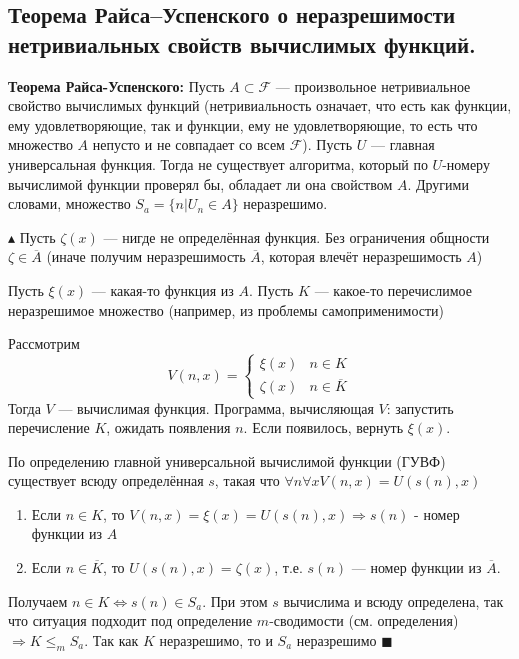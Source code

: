 \subsection{Теорема Райса–Успенского о неразрешимости нетривиальных свойств вычислимых функций.}
\par \textbf{Теорема Райса-Успенского:} Пусть $A \subset \mathcal{F}$ — произвольное нетривиальное свойство вычислимых функций (нетривиальность означает, что есть как функции, ему удовлетворяющие, так и функции, ему не удовлетворяющие, то есть что множество $A$ непусто и не совпадает со всем $\mathcal{F}$).
Пусть $U$ — главная универсальная функция. Тогда не существует алгоритма, который по $U$-номеру вычислимой функции проверял бы, обладает ли она свойством $A$. Другими словами, множество $S_a=\{n | U_n \in A\}$ неразрешимо.
\par $\blacktriangle$ Пусть $\zeta(x)$ — нигде не определённая функция. Без ограничения общности $\zeta \in  \overline{A}$ (иначе получим неразрешимость $\overline{A}$, которая влечёт неразрешимость $A$)
\par Пусть $\xi(x)$ — какая-то функция из $A$. Пусть $K$ — какое-то перечислимое неразрешимое множество (например, из проблемы самоприменимости)
\par Рассмотрим $$V(n, x) = \begin{cases}
\xi(x) & n \in K\\
\zeta(x) & n \in \overline{K}
\end{cases}$$ Тогда $V$ — вычислимая функция. Программа, вычисляющая $V$: запустить перечисление $K$, ожидать появления $n$. Если появилось, вернуть $\xi(x)$.
\par По определению главной универсальной вычислимой функции (ГУВФ) существует всюду определённая $s$, такая что $\forall n \forall x V(n,x) = U (s(n),x)$
\begin{enumerate}
    \item Если $n \in K$, то $V(n, x)=\xi(x)=U(s(n),x) \Rightarrow s(n)$ - номер функции из $A$
    \item Если $n \in \overline{K}$, то $U(s(n), x)=\zeta(x)$, т.е. $s(n)$ — номер функции из $\overline{A}$.
\end{enumerate}
\par Получаем $n \in K \Leftrightarrow s(n) \in S_a$. При этом $s$ вычислима и всюду определена, так что ситуация подходит под
определение $m$-сводимости (см. определения) $\Rightarrow K \leq_m S_a$. Так как $K$ неразрешимо, то и $S_a$ неразрешимо $\blacksquare$

